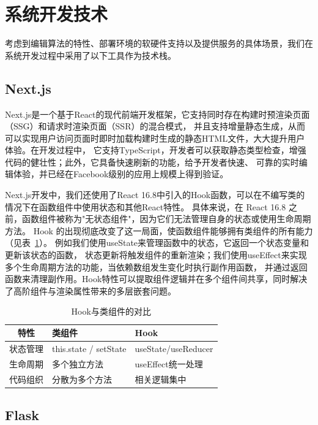 \section{系统开发技术}

考虑到编辑算法的特性、部署环境的软硬件支持以及提供服务的具体场景，我们在系统开发过程中采用了以下工具作为技术栈。

\subsection{Next.js}

Next.js是一个基于React的现代前端开发框架，它支持同时存在构建时预渲染页面（SSG）和请求时渲染页面（SSR）的混合模式，
并且支持增量静态生成，从而可以实现用户访问页面时即时加载构建时生成的静态HTML文件，大大提升用户体验。在开发过程中，
它支持TypeScript，开发者可以获取静态类型检查，增强代码的健壮性；此外，它具备快速刷新的功能，给予开发者快速、
可靠的实时编辑体验，并已经在Facebook级别的应用上规模上得到验证。

Next.js开发中，我们还使用了React 16.8中引入的Hook函数，可以在不编写类的情况下在函数组件中使用状态和其他React特性。
具体来说，在 React 16.8 之前，函数组件被称为"无状态组件"，因为它们无法管理自身的状态或使用生命周期方法。
Hook 的出现彻底改变了这一局面，使函数组件能够拥有类组件的所有能力（见表~\ref{tab:hooks}）。
例如我们使用useState来管理函数中的状态，它返回一个状态变量和更新该状态的函数，
状态更新将触发组件的重新渲染；我们使用useEffect来实现多个生命周期方法的功能，当依赖数组发生变化时执行副作用函数，
并通过返回函数来清理副作用。Hook特性可以提取组件逻辑并在多个组件间共享，同时解决了高阶组件与渲染属性带来的多层嵌套问题。

\begin{table}
    \centering
    \caption{Hook与类组件的对比}
    \label{tab:hooks}
    \begin{tabular}{cll}
        \toprule
        特性   & 类组件  &Hook                                  \\
        \midrule
        状态管理 & this.state / setState & useState/useReducer \\
        生命周期 & 多个独立方法 & useEffect统一处理   \\
        代码组织 & 分散为多个方法 & 相关逻辑集中  \\
        \bottomrule
    \end{tabular}
\end{table}

\subsection{Flask}

